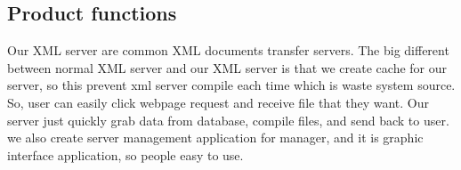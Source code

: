 
\subsection{Product functions}
Our XML server are common XML documents transfer servers. The big different between normal XML server and our XML server is that we create cache for our server, so this prevent xml server compile each time which is waste system source.
So, user can easily click webpage request and receive file that they want. Our server just quickly grab data from database, compile files, and send back to user.
we also create server management application for manager, and it is graphic interface application, so people easy to use.

% 

